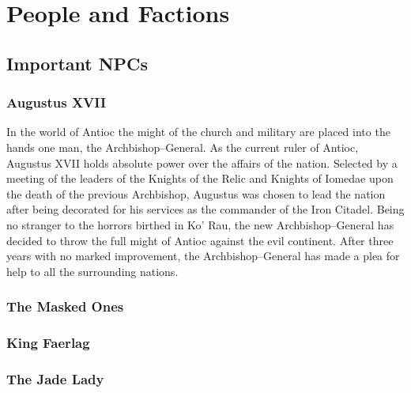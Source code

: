 \section{People and Factions}
	
	\subsection{Important NPCs}

		\subsubsection{Augustus XVII}
			In the world of Antioc the might of the church and military are 
			placed into the hands one man, the Archbishop--General.  As the 
			current ruler of Antioc, Augustus XVII holds absolute power over
			the affairs of the nation.  Selected by a meeting of the leaders
			of the Knights of the Relic and Knights of Iomedae upon the death 
			of the previous Archbishop, Augustus was chosen to lead the nation
			after being decorated for his services as the commander of the Iron
			Citadel.  Being no stranger to the horrors birthed in Ko' Rau,  
			the new Archbishop--General has decided to throw the full might of 
			Antioc against the evil continent.  After three years with no 
			marked improvement, the Archbishop--General has made a plea for 
			help to all the surrounding nations.

		\subsubsection{The Masked Ones}
			
		\subsubsection{King Faerlag}

		\subsubsection{The Jade Lady}

